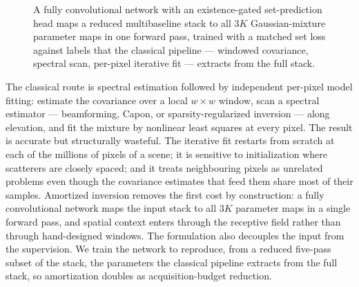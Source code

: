 \begin{figure}[H]
  \caption{A fully convolutional network with an existence-gated set-prediction head maps a reduced multibaseline stack to all $3K$ Gaussian-mixture parameter maps in one forward pass, trained with a matched set loss against labels that the classical pipeline --- windowed covariance, spectral scan, per-pixel iterative fit --- extracts from the full stack.}
  \label{fig:teaser}
\end{figure}

The classical route is spectral estimation followed by independent per-pixel model fitting: estimate the covariance over a local $w \times w$ window, scan a spectral estimator --- beamforming, Capon, or sparsity-regularized inversion \citep{zhu2010tomosar} --- along elevation, and fit the mixture by nonlinear least squares at every pixel. The result is accurate but structurally wasteful. The iterative fit restarts from scratch at each of the millions of pixels of a scene; it is sensitive to initialization where scatterers are closely spaced; and it treats neighbouring pixels as unrelated problems even though the covariance estimates that feed them share most of their samples. Amortized inversion \citep{gregor2010lista, yang2016admmnet} removes the first cost by construction: a fully convolutional network maps the input stack to all $3K$ parameter maps in a single forward pass, and spatial context enters through the receptive field rather than through hand-designed windows. The formulation also decouples the input from the supervision. We train the network to reproduce, from a reduced five-pass subset of the stack, the parameters the classical pipeline extracts from the full stack, so amortization doubles as acquisition-budget reduction.

